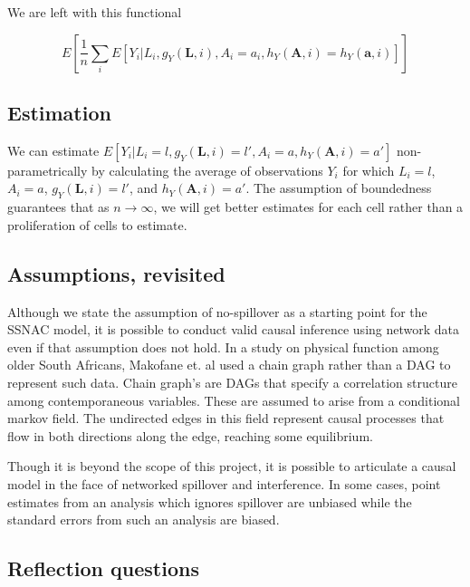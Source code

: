 \documentclass[
  letterpaper,
  DIV=11,
  numbers=noendperiod,
  oneside]{scrreprt}
\begin{document}
We are left with this functional

\[
E[ \frac{1}{n} \sum_i  E[Y_i |  L_i , g_Y(\mathbf{L}, i), A_i = a_i, h_Y(\textbf{A}, i) = h_Y(\textbf{a}, i) ]]
\]

\hypertarget{estimation-1}{%
\subsection{Estimation}\label{estimation-1}}

We can estimate
\(E[Y_i | L_i = l , g_Y(\mathbf{L}, i) = l', A_i = a, h_Y(\textbf{A}, i) = a' ]\)
non-parametrically by calculating the average of observations \(Y_i\)
for which \(L_i = l\), \(A_i = a\), \(g_Y(\mathbf{L}, i) = l'\), and
\(h_Y(\textbf{A}, i) = a'\). The assumption of boundedness guarantees
that as \(n \rightarrow \infty\), we will get better estimates for each
cell rather than a proliferation of cells to estimate.

\hypertarget{assumptions-revisited-1}{%
\subsection{Assumptions, revisited}\label{assumptions-revisited-1}}

Although we state the assumption of no-spillover as a starting point for
the SSNAC model, it is possible to conduct valid causal inference using
network data even if that assumption does not hold. In a study on
physical function among older South Africans, Makofane et. al used a
chain graph rather than a DAG to represent such data. Chain graph's are
DAGs that specify a correlation structure among contemporaneous
variables. These are assumed to arise from a conditional markov field.
The undirected edges in this field represent causal processes that flow
in both directions along the edge, reaching some equilibrium.

Though it is beyond the scope of this project, it is possible to
articulate a causal model in the face of networked spillover and
interference. In some cases, point estimates from an analysis which
ignores spillover are unbiased while the standard errors from such an
analysis are biased.

\hypertarget{reflection-questions-1}{%
\subsection*{Reflection questions}\label{reflection-questions-1}}
\end{document}
